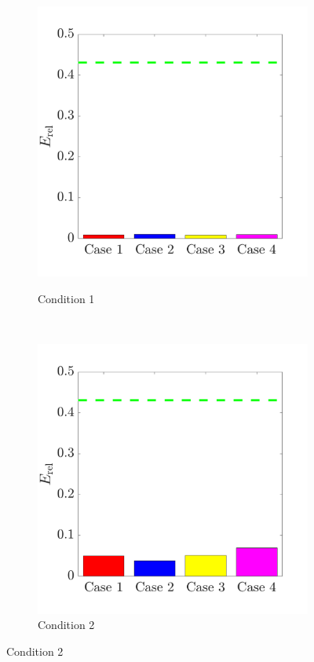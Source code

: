 \documentclass{jov}
\begin{document}
\begin{figure}
\centering
\begin{subfigure}{0.22 \textwidth}
	\caption{Condition 1}
	\includegraphics[width=\textwidth]{../Figures/Figure15/Figure15_a.pdf}
	\label{fig:case1Bar}
    \end{subfigure}
    ~ 
    \begin{subfigure}{0.22 \textwidth}   
	\caption{Condition 2}
	\includegraphics[width=\textwidth]{../Figures/Figure15/Figure15_b.pdf}

\end{subfigure}
\end{figure}
\end{document}
